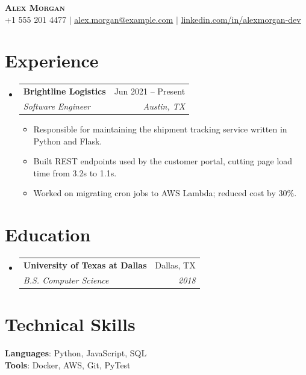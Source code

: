 \documentclass[letterpaper,11pt]{article}
\makeatletter
\newcommand{\resumeItem}[1]{\item\small{{#1 \vspace{-2pt}}}}
\newcommand{\resumeSubheading}[4]{
  \vspace{-2pt}\item
    \begin{tabular*}{0.97\textwidth}[t]{l@{\extracolsep{\fill}}r}
      \textbf{#1} & #2 \\
      \textit{\small#3} & \textit{\small #4} \\
    \end{tabular*}\vspace{-7pt}
}
\newcommand{\resumeSubHeadingListStart}{\begin{itemize}[leftmargin=0.15in, label={}]}
\newcommand{\resumeSubHeadingListEnd}{\end{itemize}}
\newcommand{\resumeItemListStart}{\begin{itemize}}
\newcommand{\resumeItemListEnd}{\end{itemize}\vspace{-5pt}}
\makeatother
\begin{document}
\begin{center}
    \textbf{\Huge \scshape Alex Morgan} \\ \vspace{1pt}
    \small +1 555 201 4477 $|$ \href{mailto:alex.morgan@example.com}{\underline{alex.morgan@example.com}} $|$
    \href{https://linkedin.com/in/alexmorgan-dev}{\underline{linkedin.com/in/alexmorgan-dev}}
\end{center}

\section{Experience}
  \resumeSubHeadingListStart
    \resumeSubheading
      {Brightline Logistics}{Jun 2021 -- Present}
      {Software Engineer}{Austin, TX}
      \resumeItemListStart
        \resumeItem{Responsible for maintaining the shipment tracking service written in Python and Flask.}
        \resumeItem{Built REST endpoints used by the customer portal, cutting page load time from 3.2s to 1.1s.}
        \resumeItem{Worked on migrating cron jobs to AWS Lambda; reduced cost by 30\%.}
      \resumeItemListEnd
  \resumeSubHeadingListEnd

\section{Education}
  \resumeSubHeadingListStart
    \resumeSubheading
      {University of Texas at Dallas}{Dallas, TX}
      {B.S. Computer Science}{2018}
  \resumeSubHeadingListEnd

\section{Technical Skills}
 \begin{itemize}[leftmargin=0.15in, label={}]
    \small{\item{
     \textbf{Languages}{: Python, JavaScript, SQL} \\
     \textbf{Tools}{: Docker, AWS, Git, PyTest}
    }}
 \end{itemize}
\end{document}
